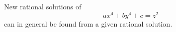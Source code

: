 \begin{proposition}
    New rational solutions of
\[
    ax^4+by^4+c=z^2
\]
    can in general be found from a given rational solution.
\end{proposition}
